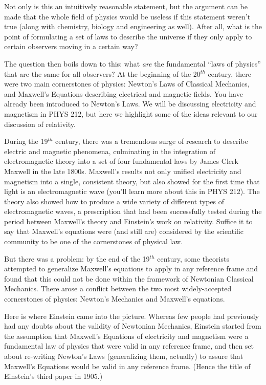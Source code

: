 Not only is this an intuitively reasonable statement, but
the argument can be made that the whole field of physics would be
useless if this statement weren't true (along with chemistry, biology
and engineering as well).  After all, what is the point of formulating
a set of laws to describe the universe if they only apply to certain
observers moving in a certain way?
   
The question then boils down to this: what \emph{are} the fundamental ``laws
of physics'' that are the same for all observers?  At the beginning of
the 20$^{ th}$ century, there were two main cornerstones of physics:
Newton's Laws of Classical Mechanics, and Maxwell's Equations
describing electrical and magnetic fields.  You have already been
introduced to Newton's Laws.  We will be discussing
electricity and magnetism in PHYS 212, but here we highlight some of
the ideas relevant to our discussion of relativity.
   
During the 19$^{ th}$ century, there was a tremendous surge of
research to describe electric and magnetic phenomena, culminating in
the integration of electromagnetic theory into a set of four
fundamental laws by James Clerk Maxwell in the late 1800s.  Maxwell's
results not only unified electricity and magnetism into a single,
consistent theory, but also showed for the first time that light is an
electromagnetic wave (you'll learn more about this in PHYS 212).  The
theory also showed how to produce a wide variety of different types of
electromagnetic waves, a prescription that had been successfully
tested during the period between Maxwell's theory and Einstein's work
on relativity.  Suffice it to say that Maxwell's equations were
 (and still are) considered by the scientific community to be one of
the cornerstones of physical law.
   
But there was a problem: by the end of the 19$^{ th}$ century, some
theorists 
attempted to generalize Maxwell's equations to apply in
any reference frame and found that this could not be done within the
framework of Newtonian Classical Mechanics.  There arose
a conflict between the two most widely-accepted cornerstones of
physics: Newton's Mechanics and Maxwell's equations.
   
Here is where Einstein came into the picture.  Whereas few people had
previously had any doubts about the validity of Newtonian Mechanics,
Einstein started from the assumption that Maxwell's Equations of
electricity and magnetism were a fundamental law of physics that were
valid in any reference frame, and then set about re-writing Newton's
Laws (generalizing them, actually) to assure that Maxwell's Equations
would be valid in any reference frame.  (Hence the title of Einstein's
third paper in 1905.)
   
